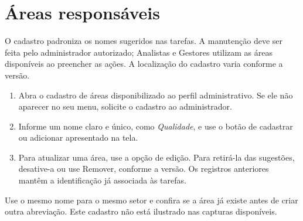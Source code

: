\Needspace{190pt}
\section{Áreas responsáveis}

O cadastro padroniza os nomes sugeridos nas tarefas. A manutenção deve ser feita
pelo administrador autorizado; Analistas e Gestores utilizam as áreas disponíveis
ao preencher as ações. A localização do cadastro varia conforme a versão.

\begin{enumerate}
\item Abra o cadastro de áreas disponibilizado ao perfil administrativo. Se ele
não aparecer no seu menu, solicite o cadastro ao administrador.
\item Informe um nome claro e único, como \emph{Qualidade}, e use o botão de
cadastrar ou adicionar apresentado na tela.
\item Para atualizar uma área, use a opção de edição. Para retirá-la das
sugestões, desative-a ou use Remover, conforme a versão. Os registros anteriores
mantêm a identificação já associada às tarefas.
\end{enumerate}

Use o mesmo nome para o mesmo setor e confira se a área já existe antes de criar
outra abreviação. Este cadastro não está ilustrado nas capturas disponíveis.

\fimdecapitulo
